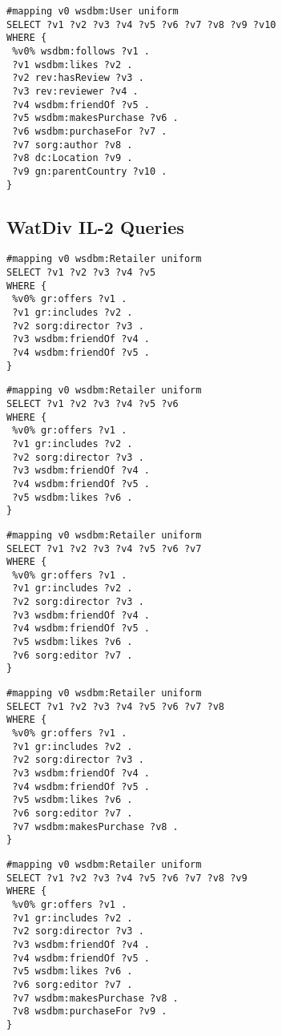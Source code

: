 \begin{lstlisting}[caption={IL-1-10},label=query:IL-1-10]
#mapping v0 wsdbm:User uniform
SELECT ?v1 ?v2 ?v3 ?v4 ?v5 ?v6 ?v7 ?v8 ?v9 ?v10
WHERE {
 %v0% wsdbm:follows ?v1 .
 ?v1 wsdbm:likes ?v2 .
 ?v2 rev:hasReview ?v3 .
 ?v3 rev:reviewer ?v4 .
 ?v4 wsdbm:friendOf ?v5 .
 ?v5 wsdbm:makesPurchase ?v6 .
 ?v6 wsdbm:purchaseFor ?v7 .
 ?v7 sorg:author ?v8 .
 ?v8 dc:Location ?v9 .
 ?v9 gn:parentCountry ?v10 .
}
\end{lstlisting}

\subsection{WatDiv IL-2 Queries} 

\begin{lstlisting}[caption={IL-2-5},label=query:IL-2-5]
#mapping v0 wsdbm:Retailer uniform
SELECT ?v1 ?v2 ?v3 ?v4 ?v5
WHERE {
 %v0% gr:offers ?v1 .
 ?v1 gr:includes ?v2 .
 ?v2 sorg:director ?v3 .
 ?v3 wsdbm:friendOf ?v4 .
 ?v4 wsdbm:friendOf ?v5 .
}
\end{lstlisting}

\begin{lstlisting}[caption={IL-2-7},label=query:IL-2-6]
#mapping v0 wsdbm:Retailer uniform
SELECT ?v1 ?v2 ?v3 ?v4 ?v5 ?v6
WHERE {
 %v0% gr:offers ?v1 .
 ?v1 gr:includes ?v2 .
 ?v2 sorg:director ?v3 .
 ?v3 wsdbm:friendOf ?v4 .
 ?v4 wsdbm:friendOf ?v5 .
 ?v5 wsdbm:likes ?v6 .
}
\end{lstlisting}

\begin{lstlisting}[caption={IL-2-7},label=query:IL-2-7]
#mapping v0 wsdbm:Retailer uniform
SELECT ?v1 ?v2 ?v3 ?v4 ?v5 ?v6 ?v7
WHERE {
 %v0% gr:offers ?v1 .
 ?v1 gr:includes ?v2 .
 ?v2 sorg:director ?v3 .
 ?v3 wsdbm:friendOf ?v4 .
 ?v4 wsdbm:friendOf ?v5 .
 ?v5 wsdbm:likes ?v6 .
 ?v6 sorg:editor ?v7 .
}
\end{lstlisting}

\begin{lstlisting}[caption={IL-2-8},label=query:IL-2-8]
#mapping v0 wsdbm:Retailer uniform
SELECT ?v1 ?v2 ?v3 ?v4 ?v5 ?v6 ?v7 ?v8
WHERE {
 %v0% gr:offers ?v1 .
 ?v1 gr:includes ?v2 .
 ?v2 sorg:director ?v3 .
 ?v3 wsdbm:friendOf ?v4 .
 ?v4 wsdbm:friendOf ?v5 .
 ?v5 wsdbm:likes ?v6 .
 ?v6 sorg:editor ?v7 .
 ?v7 wsdbm:makesPurchase ?v8 .
}
\end{lstlisting}

\begin{lstlisting}[caption={IL-2-9},label=query:IL-2-9]
#mapping v0 wsdbm:Retailer uniform
SELECT ?v1 ?v2 ?v3 ?v4 ?v5 ?v6 ?v7 ?v8 ?v9
WHERE {
 %v0% gr:offers ?v1 .
 ?v1 gr:includes ?v2 .
 ?v2 sorg:director ?v3 .
 ?v3 wsdbm:friendOf ?v4 .
 ?v4 wsdbm:friendOf ?v5 .
 ?v5 wsdbm:likes ?v6 .
 ?v6 sorg:editor ?v7 .
 ?v7 wsdbm:makesPurchase ?v8 .
 ?v8 wsdbm:purchaseFor ?v9 .
}
\end{lstlisting}

